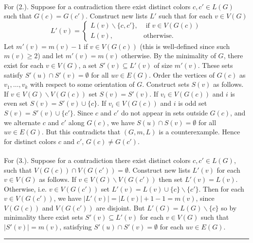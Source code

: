 \documentclass[letterpaper,12pt,oneside,onecolumn]{article}
\newenvironment{proof}{{\bf Proof:  }}{\hfill\rule{2mm}{2mm}}
\begin{document}
\begin{proof}
	\paragraph{}For (2.). Suppose for a contradiction there exist distinct colors $c,c' \in L(G)$ such that $G(c) = G(c')$. Construct new lists $L'$ such that for each $v \in V(G)$
	$$ L'(v) = \begin{cases}
	L(v) \backslash \{c,c'\}, &\text{ if } v \in V(G(c)) \\
	L(v), &\text{otherwise.}
		\end{cases}$$
	Let $m'(v) = m(v) - 1$ if $v \in V(G(c))$ (this is well-defined since such $m(v) \geq 2$) and let $m'(v) = m(v)$ otherwise.  By the minimality of $G$, there exist for each $v \in V(G)$, a set $S'(v)\subseteq L'(v)$ of size $m'(v)$. These sets satisfy $S'(u) \cap S'(v) = \emptyset$ for all $uv \in E(G)$. Order the vertices of $G(c)$ as $v_1, \dots, v_k$ with respect to some orientation of $G$. Construct sets $S(v)$ as follows. If $v \in V(G) \backslash V(G(c))$ set $S(v) = S'(v)$. If $v_i \in V(G(c))$ and $i$ is even set $S(v) = S'(v) \cup \{c\}$. If $v_i \in V(G(c))$ and $i$ is odd set $S(v) = S'(v) \cup \{c'\}$. Since $c$ and $c'$ do not appear in sets outside $G(c)$, and we alternate $c$ and $c'$ along $G(c)$, we have $S(u) \cap S(v) = \emptyset$ for all $uv \in E(G)$. But this contradicts that $(G,m,L)$ is a counterexample. Hence for distinct colors $c$ and $c'$, $G(c) \neq G(c')$.
	\paragraph{} For (3.). Suppose for a contradiction  there exist distinct colors $c,c' \in L(G)$, such that $V(G(c)) \cap V(G(c')) = \emptyset$. Construct new lists $L'(v)$ for each $v \in V(G)$ as follows. If $v \in V(G) \backslash V(G(c'))$ then set $L'(v) = L(v)$. Otherwise, i.e. $v \in V(G(c'))$ set $L'(v) = L(v) \cup \{c\} \backslash \{c'\}.$ Then for each $v \in V(G(c'))$, we have $|L'(v)|  = |L(v)| + 1 - 1 = m(v)$, since $V(G(c))$ and $V(G(c'))$ are disjoint. But $L'(G) = L(G) \backslash \{c\}$ so by minimality there exist sets $S'(v) \subseteq L'(v)$ for each $v \in V(G)$ such that $|S'(v)| = m(v)$, satisfying $S'(u) \cap S'(v) = \emptyset$ for each $uv \in E(G)$.

\end{proof}
\end{document}
